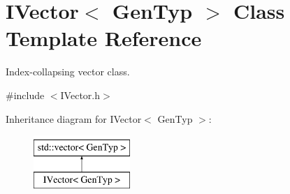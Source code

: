 \hypertarget{class_i_vector}{}\section{I\+Vector$<$ Gen\+Typ $>$ Class Template Reference}
\label{class_i_vector}


Index-\/collapsing vector class.  




{\ttfamily \#include $<$I\+Vector.\+h$>$}

Inheritance diagram for I\+Vector$<$ Gen\+Typ $>$\+:\begin{figure}[H]
\begin{center}
\leavevmode
\includegraphics[height=2.000000cm]{class_i_vector}
\end{center}
\end{figure}
